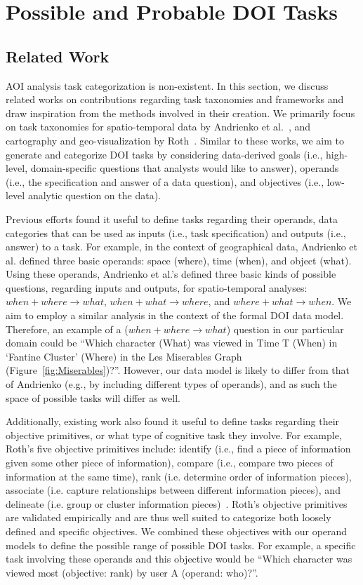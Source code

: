 \section{Possible and Probable DOI Tasks}
\label{sec:DOIAnalysisTasks}

\subsection{Related Work}
AOI analysis task categorization is non-existent. In this section, we discuss related works on contributions regarding task taxonomies and frameworks and draw inspiration from the methods involved in their creation. We primarily focus on task taxonomies for spatio-temporal data by Andrienko et al.~\cite{And03}, and cartography and geo-visualization by Roth~\cite{Roth13}. Similar to these works, we aim to generate and categorize DOI tasks by considering data-derived goals (i.e., high-level, domain-specific questions that analysts would like to answer), operands (i.e., the specification and answer of a data question), and objectives (i.e., low-level analytic question on the data). 

Previous efforts found it useful to define tasks regarding their operands, data categories that can be used as inputs (i.e., task specification) and outputs (i.e., answer) to a task.  For example, in the context of geographical data, Andrienko et al. defined three basic operands: space (where), time (when), and object (what). Using these operands, Andrienko et al.'s defined three basic kinds of possible questions, regarding inputs and outputs, for spatio-temporal analyses: $when + where \rightarrow what$, $when + what \rightarrow where$, and $where + what \rightarrow when$. We aim to employ a similar analysis in the context of the formal DOI data model. Therefore, an example of a ($when + where \rightarrow what$) question in our particular domain could be ``Which character (What) was viewed in Time T (When) in `Fantine Cluster' (Where) in the Les Miserables Graph (Figure~\ref{fig:Miserables})?''. However, our data model is likely to differ from that of Andrienko (e.g., by including different types of operands), and as such the space of possible tasks will differ as well. 

Additionally, existing work also found it useful to define tasks regarding their objective primitives, or what type of cognitive task they involve. For example, Roth's five objective primitives include: identify (i.e., find a piece of information given some other piece of information), compare (i.e., compare two pieces of information at the same time), rank (i.e. determine order of information pieces), associate (i.e. capture relationships between different information pieces), and delineate (i.e. group or cluster information pieces)~\cite{Roth13}.  Roth's objective primitives are validated empirically and are thus well suited to categorize both loosely defined and specific objectives. We combined these objectives with our operand models to define the possible range of possible DOI tasks. For example, a specific task involving these operands and this objective would be ``Which character was viewed most (objective: rank) by user A (operand: who)?''. 


